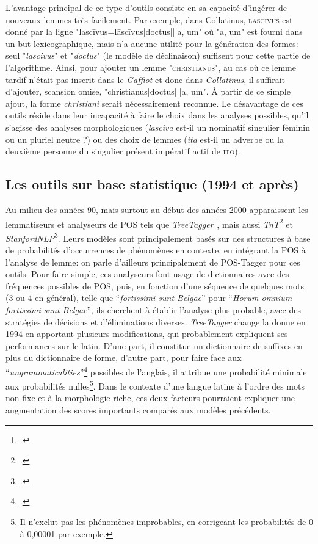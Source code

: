 L'avantage principal de ce type d'outils consiste en sa capacité d'ingérer de nouveaux lemmes très facilement. Par exemple, dans Collatinus, \textsc{lascivus} est donné par la ligne "lascīvus=lāscīvus|doctus|||a, um" où "a, um" est fourni dans un but lexicographique, mais n'a aucune utilité pour la génération des formes: seul "\textit{lascivus}" et "\textit{doctus}" (le modèle de déclinaison) suffisent pour cette partie de l'algorithme. Ainsi, pour ajouter un lemme "\textsc{christianus}", au cas où ce lemme tardif n'était pas inscrit dans le \textit{Gaffiot} et donc dans \textit{Collatinus}, il suffirait d'ajouter, scansion omise, "christianus|doctus|||a, um". À partir de ce simple ajout, la forme \textit{christiani} serait nécessairement reconnue. Le désavantage de ces outils réside dans leur incapacité à faire le choix dans les analyses possibles, qu'il s'agisse des analyses morphologiques (\textit{lasciva} est-il un nominatif singulier féminin ou un pluriel neutre ?) ou des choix de lemmes (\textit{ita} est-il un adverbe ou la deuxième personne du singulier présent impératif actif de \textsc{ito}).

\subsection{Les outils sur base statistique (1994 et après)}

Au milieu des années 90, mais surtout au début des années 2000 apparaissent les lemmatiseurs et analyseurs de POS tels que \textit{TreeTagger}\footcite{schmid1994treetagger}, mais aussi \textit{TnT}\footcite{brants_tnt_2000} et \textit{StanfordNLP}\footcite{toutanova_feature-rich_2003}. Leurs modèles sont principalement basés sur des structures à base de probabilités d'occurrences de phénomènes en contexte, en intégrant la POS à l'analyse de lemme: on parle d'ailleurs principalement de POS-Tagger pour ces outils. Pour faire simple, ces analyseurs font usage de dictionnaires avec des fréquences possibles de POS, puis, en fonction d'une séquence de quelques mots (3 ou 4 en général), telle que \enquote{\textit{fortissimi sunt Belgae}} pour \enquote{\textit{Horum omnium fortissimi sunt Belgae}}, ils cherchent à établir l'analyse plus probable, avec des stratégies de décisions et d'éliminations diverses. \textit{TreeTagger} change la donne en 1994 en apportant plusieurs modifications, qui probablement expliquent ses performances sur le latin. D'une part, il constitue un dictionnaire de suffixes en plus du dictionnaire de forme, d'autre part, pour faire face aux \enquote{\textit{ungrammaticalities}}\footcite[p.~2]{schmid1994treetagger} possibles de l'anglais, il attribue une probabilité minimale aux probabilités nulles\footnote{Il n'exclut pas les phénomènes improbables, en corrigeant les probabilités de 0 à 0,00001 par exemple.}. Dans le contexte d'une langue latine à l'ordre des mots non fixe et à la morphologie riche, ces deux facteurs pourraient expliquer une augmentation des scores importants comparés aux modèles précédents.

